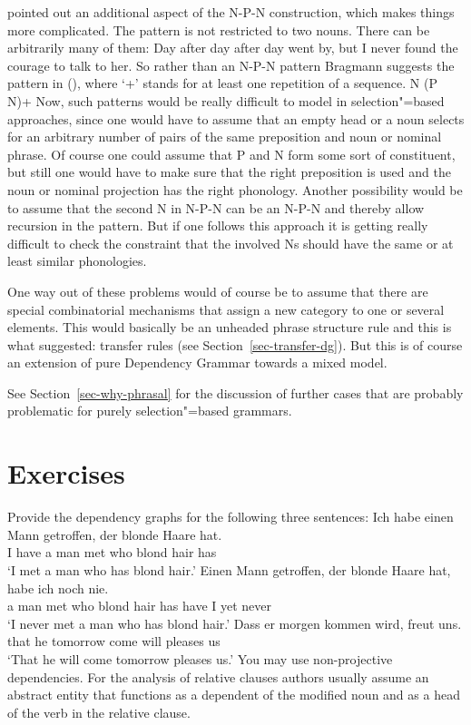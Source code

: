 \citet{Bragmann2015a} pointed out an additional aspect of the N-P-N construction, which makes things
more complicated. The pattern is not restricted to two nouns. There can be arbitrarily many of them:
\ea
Day after day after day went by, but I never found the courage to talk to her.
\z
So rather than an N-P-N pattern Bragmann suggests the pattern in (), where `+'\is{+} stands for at
least one repetition of a sequence.
\ea
\label{n-p-n-plus-cx}
N (P N)+
\z
Now, such patterns would be really difficult to model in selection"=based approaches, since one
would have to assume that an empty head or a noun selects for an arbitrary number of pairs of the
same preposition and noun or nominal phrase. Of course one could assume that P and N form some sort
of constituent, but still one would have to make sure that the right preposition is used and the
noun or nominal projection has the right phonology. Another possibility would be to assume that the
second N in N-P-N can be an N-P-N and thereby allow recursion in the pattern. But if one follows
this approach it is getting really difficult to check the constraint that the involved Ns should
have the same or at least similar phonologies.

One way out of these problems would of course be to assume that there are special combinatorial
mechanisms that assign a new category to one or several elements. This would basically be an
unheaded phrase structure rule and this is what \tes suggested: transfer rules (see
Section~\ref{sec-transfer-dg}). But this is of course an extension of pure Dependency Grammar
towards a mixed model.

See Section~\ref{sec-why-phrasal} for the discussion of further cases that are probably problematic
for purely selection"=based grammars.

\section*{Exercises}

Provide the dependency graphs for the following three sentences:
\eal
\ex 
\gll Ich habe einen Mann getroffen, der blonde Haare hat.\\
     I have a man met who blond hair has\\
\glt `I met a man who has blond hair.'
\ex 
\gll Einen Mann getroffen, der blonde Haare hat, habe ich noch nie.\\
     a man met who blond hair has have I yet never\\
\glt `I never met a man who has blond hair.'
\ex 
\gll Dass er morgen kommen wird, freut uns.\\
     that he tomorrow come will pleases us\\
\glt `That he will come tomorrow pleases us.'
\zl
You may use non-projective dependencies. For the analysis of relative clauses authors usually assume
an abstract entity that functions as a dependent of the modified noun and as a head of the verb in
the relative clause.

